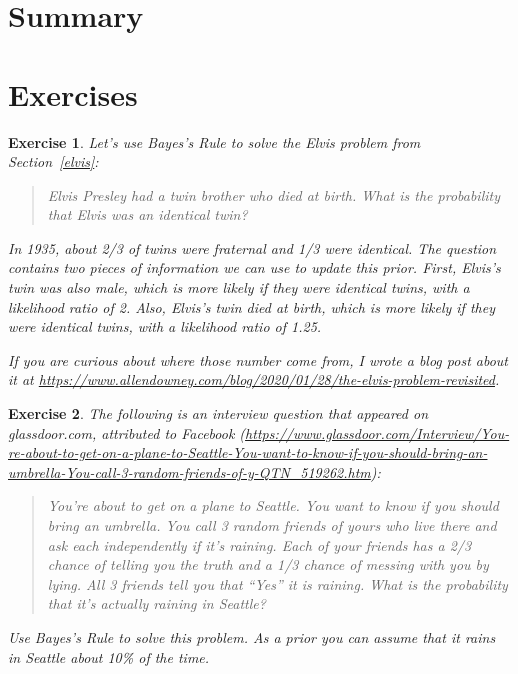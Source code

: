 \documentclass[12pt]{book}
\theoremstyle{exercise}
\newtheorem{exercise}{Exercise}[chapter]
\begin{document}
\section{Summary}

\section{Exercises}

\begin{exercise}
Let's use Bayes's Rule to solve the Elvis problem from Section~\ref{elvis}:

\begin{quote}
Elvis Presley had a twin brother who died at birth. What is the probability that Elvis was an identical twin?
\end{quote}

In 1935, about 2/3 of twins were fraternal and 1/3 were identical.
The question contains two pieces of information we can use to update this prior.
First, Elvis's twin was also male, which is more likely if they were identical twins, with a likelihood ratio of 2.
Also, Elvis's twin died at birth, which is more likely if they were identical twins, with a likelihood ratio of 1.25.

If you are curious about where those number come from, I wrote a blog post about it at \url{https://www.allendowney.com/blog/2020/01/28/the-elvis-problem-revisited}.
\end{exercise}


\begin{exercise}
The following is an interview question that appeared on glassdoor.com, attributed to Facebook (\url{https://www.glassdoor.com/Interview/You-re-about-to-get-on-a-plane-to-Seattle-You-want-to-know-if-you-should-bring-an-umbrella-You-call-3-random-friends-of-y-QTN_519262.htm}):

\begin{quote}
You're about to get on a plane to Seattle. You want to know if you should bring an umbrella. You call 3 random friends of yours who live there and ask each independently if it's raining. Each of your friends has a 2/3 chance of telling you the truth and a 1/3 chance of messing with you by lying. All 3 friends tell you that ``Yes'' it is raining. What is the probability that it's actually raining in Seattle?
\end{quote}

Use Bayes's Rule to solve this problem.  As a prior you can assume that it rains in Seattle about 10\% of the time.
\end{exercise}
\end{document}
